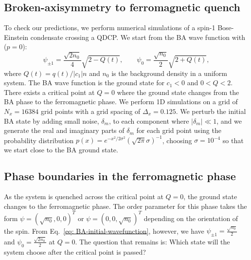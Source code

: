 \subsection{Broken-axisymmetry to ferromagnetic quench}
To check our predictions, we perform numerical simulations of a spin-1
Bose-Einstein condensate crossing a QDCP\@.
We start from the BA wave function with (\( p=0 \)):
\begin{equation}
    \psi_{\pm 1} = \frac{\sqrt{2n_0}}{4}\sqrt{2 - Q(t)}, \qquad
    \psi_0 = \frac{\sqrt{n_0}}{2}\sqrt{2 + Q(t)},
    \label{eq: BA-initial-wavefunction}
\end{equation}
where \(Q(t)=q(t)/|c_1|n\) and \(n_0\) is the background density in a uniform
system.
The BA wave function is the ground state for \(c_1 < 0\) and \(0 < Q < 2\).
There exists a critical point at \( Q = 0 \) where the ground state changes from
the BA phase to the ferromagnetic phase.
We perform 1D simulations on a grid of \(N_x = 16384\) grid points with a grid
spacing of \(\Delta_x = 0.125\).
We perturb the initial BA state by adding small noise, \(\delta_m\), to each
component where \(|\delta_m| \ll 1\), and we generate the real and imaginary
parts of \(\delta_m\) for each grid point using the probability distribution
\(p(x) = e^{-x^2/2\sigma^2}{(\sqrt{2\pi}\sigma)}^{-1}\), choosing
\(\sigma=10^{-4}\) so that we start close to the BA ground state.

\subsection{Phase boundaries in the ferromagnetic phase}
As the system is quenched across the critical point at \( Q = 0 \), the ground
state changes to the ferromagnetic phase.
The order parameter for this phase takes the form \(\psi={(\sqrt{n_0},0,0)}^T\)
or \(\psi={(0,0,\sqrt{n_0})}^T\) depending on the orientation of the spin.
From Eq.~\eqref{eq: BA-initial-wavefunction}, however, we have
\(\psi_{\pm 1} = \frac{\sqrt{n_0}}{2}\) and \(\psi_0 = \frac{\sqrt{2n_0}}{2}\)
at \( Q = 0 \).
The question that remains is: Which state will the system choose after
the critical point is passed?

